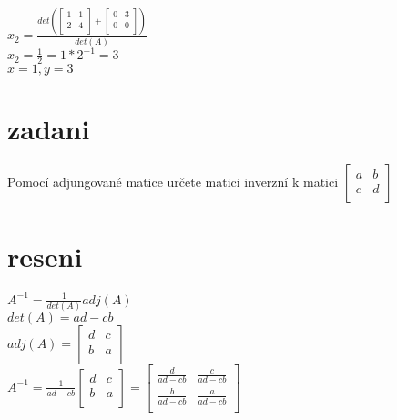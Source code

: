 \documentclass[a4paper]{article}
\begin{document}
$
x_2 = \frac{det\left(
	\left[ \begin{matrix} 
		1 & 1 \\
		2 & 4 \\
	\end{matrix} \right] + 
	\left[ \begin{matrix} 
		0 & 3 \\
		0 & 0 \\
	\end{matrix} \right]
\right)}{
	det(A)
}
$\\
$
x_2 = \frac{1}{2} = 1*2^{-1} = 3
$\\
$x = 1, y = 3$






\section*{zadani}
Pomocí adjungované matice určete matici inverzní k matici
$
\left[ \begin{matrix} 
	a & b \\
	c & d \\
\end{matrix} \right]
$



\section*{reseni}
$A^{-1} = \frac{1}{det(A)}adj(A)$\\
$det(A) = ad-cb$\\
$adj(A) = 
\left[ \begin{matrix} 
	d & c \\
	b & a \\
\end{matrix} \right]
$\\
$
A^{-1} = 
\frac{1}{ad-cb}
\left[ \begin{matrix} 
	d & c \\
	b & a \\
\end{matrix} \right] =
\left[ \begin{matrix} 
	\frac{d}{ad-cb} & \frac{c}{ad-cb} \\
	\frac{b}{ad-cb} & \frac{a}{ad-cb} \\
\end{matrix} \right]
$
\end{document}
